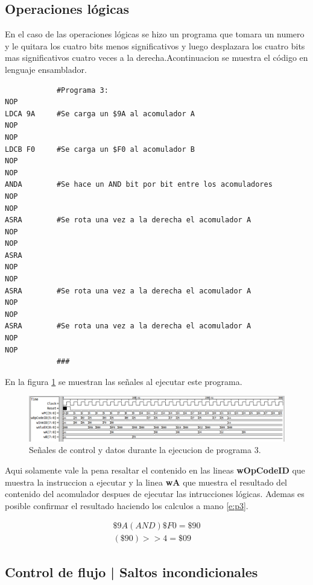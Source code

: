 \documentclass[paper=letter, fontsize=12pt]{article}
\begin{document}
\clearpage
\subsection{Operaciones lógicas}

En el caso de las operaciones lógicas se hizo un programa que tomara un numero y le quitara los cuatro bits menos significativos y luego desplazara los cuatro bits mas significativos cuatro veces a la derecha.Acontinuacion se muestra el código en lenguaje ensamblador.

\begin{lstlisting}
			#Programa 3:
NOP
LDCA 9A		#Se carga un $9A al acomulador A
NOP
NOP
LDCB F0		#Se carga un $F0 al acomulador B
NOP
NOP
ANDA		#Se hace un AND bit por bit entre los acomuladores
NOP
NOP
ASRA		#Se rota una vez a la derecha el acomulador A
NOP
NOP
ASRA
NOP
NOP
ASRA		#Se rota una vez a la derecha el acomulador A
NOP
NOP
ASRA		#Se rota una vez a la derecha el acomulador A
NOP
NOP
			###
\end{lstlisting}

En la figura \ref{i:p3} se muestran las señales al ejecutar este programa.\\

\begin{figure}[hbtp]
\centering
\includegraphics[width=1\linewidth]{../test/Prog3.png}
\caption{Señales de control y datos durante la ejecucion de programa 3.}
\label{i:p3}
\end{figure}

Aqui solamente vale la pena resaltar el contenido en las lineas \textbf{wOpCodeID} que muestra la instruccion a ejecutar y la linea \textbf{wA} que muestra el resultado del contenido del acomulador despues de ejecutar las intrucciones lógicas. Ademas es posible confirmar el resultado haciendo los calculos a mano \ref{e:p3}.

\begin{align} 
\label{e:p3}
\$9A  (AND) \$F0 = \$90 \\
(\$90) >> 4 = \$09
\end{align}


\subsection{Control de flujo | Saltos incondicionales}
\end{document}
